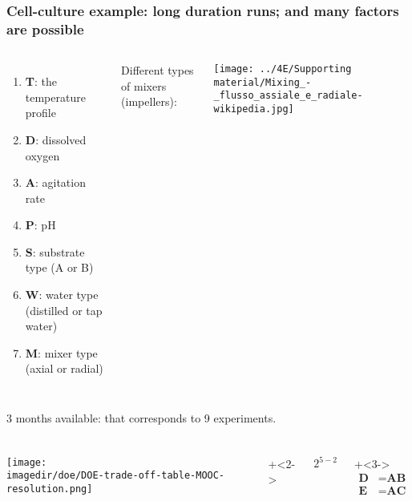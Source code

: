 \begin{frame}\frametitle{Cell-culture example: long duration runs; and many factors are possible}
	\begin{columns}[c]
			\begin{enumerate}
				\item	\textbf{T}: the temperature profile
				\item	\textbf{D}: dissolved oxygen
				\item	\textbf{A}: agitation rate
				\item	\textbf{P}: pH
				\item	\textbf{S}: substrate type (A or B)
				\item	\textbf{W}: water type (distilled or tap water)
				\item	\textbf{M}: mixer type (axial or radial)
		
			\end{enumerate}
		
			{\color{blue} \small Different types of mixers (impellers):} 
			
			\vspace{0.2cm}
			
			\centerline{\texttt{[image: ../4E/Supporting material/Mixing\_-\_flusso\_assiale\_e\_radiale-wikipedia.jpg]}}
			
	\end{columns}

	\vfill
	3 months available: {\color{myOrange} that corresponds to 9 experiments}.
	
\end{frame}

\begin{frame}\frametitle{}
	\begin{columns}[T]
			\texttt{[image: \\imagedir/doe/DOE-trade-off-table-MOOC-resolution.png]}
		
			
			\onslide+<2->{
				\vspace{2cm}
				{\Huge
					$2^{5-2}$
				} 
			 
				\vspace{2cm}
				\onslide+<3->{ 
					\begin{align*}
						\textbf{D} &= \textbf{AB}\\
						\textbf{E}\, &= \textbf{AC} 
					\end{align*}
				}
			}
	\end{columns}
	
\end{frame}

